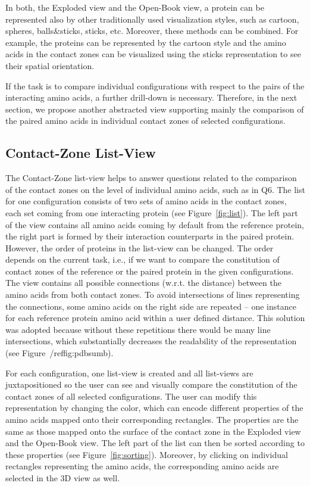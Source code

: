 \documentclass{bmcart}
\def\OpBook {Open-Book view\xspace}
\def\ExpView {Exploded view\xspace}
\def\CoZoListView {Contact-Zone list-view\xspace}
\begin{document}
In both, the \ExpView and the \OpBook, a protein can be represented also by other traditionally used visualization styles, such as cartoon, spheres, balls\&sticks, sticks, etc.
Moreover, these methods can be combined. 
For example, the proteins can be represented by the cartoon style and the amino acids in the contact zones can be visualized using the sticks representation to see their spatial orientation.%

If the task is to compare individual configurations with respect to the pairs of the interacting amino acids, a further drill-down is necessary.
Therefore, in the next section, we propose another abstracted view supporting mainly the comparison of the paired amino acids in individual contact zones of selected configurations.


\subsection*{Contact-Zone List-View}
The \CoZoListView helps to answer questions related to the comparison of the contact zones on the level of individual amino acids, such as in Q6.
The list for one configuration consists of two sets of amino acids in the contact zones, each set coming from one interacting protein (see Figure~\ref{fig:list}).
The left part of the view contains all amino acids coming by default from the reference protein, the right part is formed by their interaction counterparts in the paired protein.
However, the order of proteins in the list-view can be changed.
The order depends on the current task, i.e., if we want to compare the constitution of contact zones of the reference or the paired protein in the given configurations.
The view contains all possible connections (w.r.t. the distance) between the amino acids from both contact zones.
To avoid intersections of lines representing the connections, some amino acids on the right side are repeated -- one instance for each reference protein amino acid within a user defined distance. 
This solution was adopted because without these repetitions there would be many line intersections, which substantially decreases the readability of the representation (see Figure~/ref{fig:pdbsum}b).

For each configuration, one list-view is created and all list-views are juxtapositioned so the user can see and visually compare the constitution of the contact zones of all selected configurations.
The user can modify this representation by changing the color, which can encode different properties of the amino acids mapped onto their corresponding rectangles.
The properties are the same as those mapped onto the surface of the contact zone in the Exploded view and the Open-Book view.
The left part of the list can then be sorted according to these properties (see Figure~\ref{fig:sorting}).
Moreover, by clicking on individual rectangles representing the amino acids, the corresponding amino acids are selected in the 3D view as well.
\end{document}
